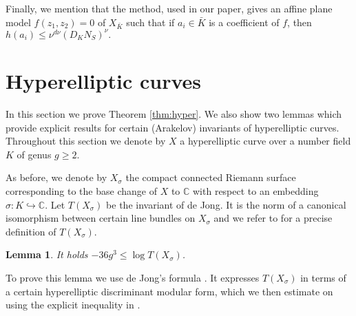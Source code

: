 \documentclass[11pt]{article}
\newtheorem{lemma}[theorem]{Lemma}
\numberwithin{equation}{section}
\begin{document}
Finally, we mention that  the method, used in our paper, gives an affine plane model $f(z_1,z_2)=0$ of $X_{\bar{K}}$ such that if $a_i\in\bar{K}$ is a coefficient of $f$, then $h(a_i)\leq \nu^{d\nu}(D_KN_S)^\nu.$

\section{Hyperelliptic curves}\label{sec:hyper}

In this section we prove Theorem \ref{thm:hyper}. We also show two lemmas which provide explicit results for certain (Arakelov) invariants of hyperelliptic curves. Throughout this section we denote by $X$ a hyperelliptic curve over a number field $K$ of genus $g\geq 2$.

As before, we denote by $X_\sigma$ the compact connected Riemann surface corresponding to the base change of $X$ to $\mathbb C$ with respect to an embedding $\sigma:K\hookrightarrow \mathbb C$. Let $T(X_\sigma)$ be the invariant of de Jong. It is the norm of a canonical isomorphism between certain line bundles on $X_\sigma$ and we refer to \cite[Definition 4.2]{dejong:riemanninvariants} for a precise definition of $T(X_\sigma)$.


\begin{lemma}\label{lem:tx}
It holds $-36g^3\leq \log T(X_\sigma)$.
\end{lemma}
 


To prove this lemma we use de Jong's formula  \cite[Theorem 4.7]{dejong:riemanninvariants}. It expresses $T(X_\sigma)$ in terms of a certain hyperelliptic discriminant modular form, which we then estimate on using the explicit inequality in \cite[Lemma 5.4]{rvk:szpiro}.
\end{document}
